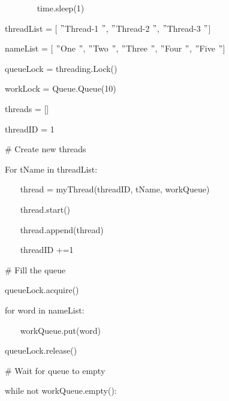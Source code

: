 \documentclass{wileySix}
\begin{document}
\noindent 
{\fontsize{10pt}{10pt}\selectfont ~~~~~~~ time.sleep(1)} \par
\vspace{12pt}
\noindent 
{\fontsize{10pt}{10pt}\selectfont threadList = [ $ " $Thread-1 $ " $,  $ " $Thread-2 $ " $,  $ " $Thread-3 $ " $]} \par
\noindent 
{\fontsize{10pt}{10pt}\selectfont nameList = [ $ " $One $ " $,  $ " $Two $ " $,  $ " $Three $ " $,  $ " $Four $ " $,  $ " $Five $ " $]} \par
\noindent 
{\fontsize{10pt}{10pt}\selectfont queueLock = threading.Lock()} \par
\noindent 
{\fontsize{10pt}{10pt}\selectfont workLock = Queue.Queue(10)} \par
\noindent 
{\fontsize{10pt}{10pt}\selectfont threads = []} \par
\noindent 
{\fontsize{10pt}{10pt}\selectfont threadID = 1} \par
\vspace{10pt}
\noindent 
{\fontsize{10pt}{10pt}\selectfont  $  \#  $ Create new threads} \par
\noindent 
{\fontsize{10pt}{10pt}\selectfont For tName in threadList:} \par
\noindent 
{\fontsize{10pt}{10pt}\selectfont ~~~ thread = myThread(threadID, tName, workQueue)} \par
\noindent 
{\fontsize{10pt}{10pt}\selectfont ~~~ thread.start()} \par
\noindent 
{\fontsize{10pt}{10pt}\selectfont ~~~ thread.append(thread)} \par
\noindent 
{\fontsize{10pt}{10pt}\selectfont ~~~ threadID +=1} \par
\vspace{10pt}
\noindent 
{\fontsize{10pt}{10pt}\selectfont  $  \#  $ Fill the queue} \par
\noindent 
{\fontsize{10pt}{10pt}\selectfont queueLock.acquire()} \par
\noindent 
{\fontsize{10pt}{10pt}\selectfont for word in nameList:} \par
\noindent 
{\fontsize{10pt}{10pt}\selectfont ~~~ workQueue.put(word)} \par
\noindent 
{\fontsize{10pt}{10pt}\selectfont queueLock.release()} \par
\vspace{10pt}
\noindent 
{\fontsize{10pt}{10pt}\selectfont  $  \#  $ Wait for queue to empty} \par
\noindent 
{\fontsize{10pt}{10pt}\selectfont while not workQueue.empty():} \par
\end{document}
